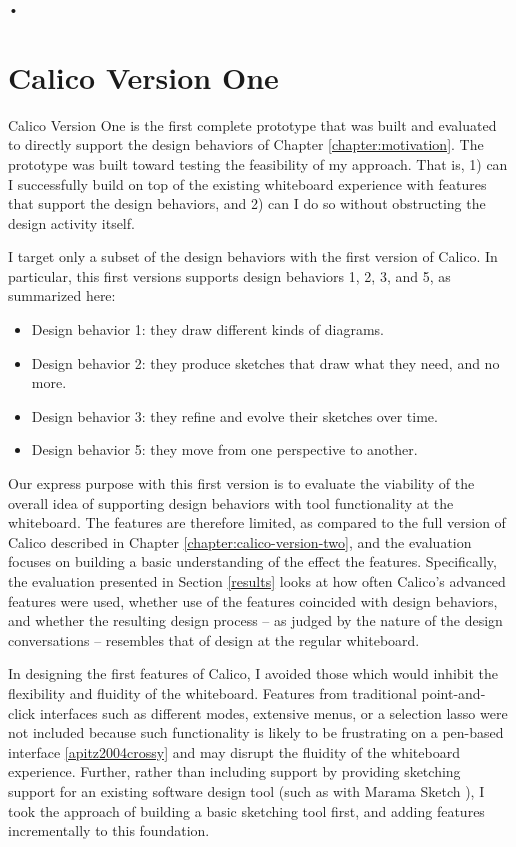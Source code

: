 \textsf{•}\chapter{Calico Version One}
\label{chapter:calico-version-one}

Calico Version One is the first complete prototype that was built and evaluated to directly support the design behaviors of Chapter \ref{chapter:motivation}. The prototype was built toward testing the feasibility of my approach. That is, 1) can I successfully build on top of the existing whiteboard experience with features that support the design behaviors, and 2) can I do so without obstructing the design activity itself.

I target only a subset of the design behaviors with the first version of Calico.  In particular, this first versions supports design behaviors 1, 2, 3, and 5, as summarized here:

\begin{itemize}
  \item Design behavior 1: they draw different kinds of diagrams.
  \item Design behavior 2: they produce sketches that draw what they need, and no more.
  \item Design behavior 3: they refine and evolve their sketches over time.
  \item Design behavior 5: they move from one perspective to another.
\end{itemize}

Our express purpose with this first version is to evaluate the viability of the overall idea of supporting design behaviors with tool functionality at the whiteboard.  The features are therefore limited, as compared to the full version of Calico described in Chapter \ref{chapter:calico-version-two}, and the evaluation focuses on building a basic understanding of the effect the features.  Specifically, the evaluation presented in Section \ref{results} looks at how often Calico's advanced features were used, whether use of the features coincided with design behaviors, and whether the resulting design process -- as judged by the nature of the design conversations -- resembles that of design at the regular whiteboard.

In designing the first features of Calico, I avoided those which would inhibit the flexibility and fluidity of the whiteboard. Features from traditional point-and-click interfaces such as different modes, extensive menus, or a selection lasso were not included because such functionality is likely to be frustrating on a pen-based interface \ref{apitz2004crossy} and may disrupt the fluidity of the whiteboard experience. Further, rather than including support by providing sketching support for an existing software design tool (such as with Marama Sketch \cite{Grundy}), I took the approach of building a basic sketching tool first, and adding features incrementally to this foundation.

